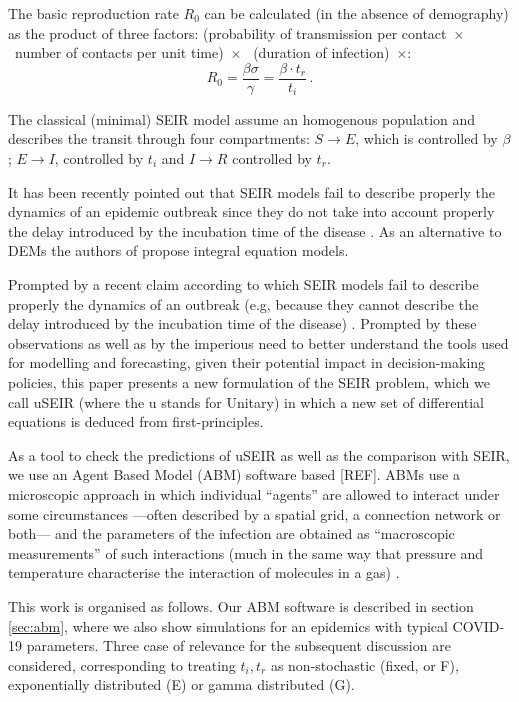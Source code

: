\documentclass[a4paper,oneside,11pt]{article}
\begin{document}
The basic reproduction rate $R_0$ can be calculated (in the absence of demography) as the product of three factors:
(probability of transmission per contact~$\times$~number of contacts per unit time)~$\times$~
(duration of infection)~$\times$:
\begin{equation}
R_0 = \frac{\beta \sigma}{\gamma} = \frac{\beta \cdot t_r}{t_i}\,.
\end{equation}

The classical (minimal) SEIR model assume an homogenous population and describes the transit through four compartments: $S \rightarrow E$, which is controlled by $\beta$ ; $E \rightarrow I$, controlled by $t_i$ and
$I \rightarrow R$ controlled by $t_r$. 

It has been recently pointed out that SEIR models fail to describe properly the dynamics of an epidemic outbreak since they do not take into account properly the delay introduced by the incubation time of the disease \cite{fodor2020integral}. As an alternative to DEMs the authors of \cite{fodor2020integral} propose integral equation models. 

Prompted by a recent claim according to which SEIR 
models fail to describe properly the dynamics of an outbreak (e.g, because they cannot describe the delay introduced by the incubation time of the disease) \cite{fodor2020integral}. Prompted by these observations as well as by the imperious need to better understand the tools used for modelling and forecasting, given their potential impact in decision-making policies, this paper presents a new formulation of the SEIR problem, which we call uSEIR (where the u stands for Unitary) in which a new set of differential equations is deduced from first-principles.

As a tool to check the predictions of uSEIR as well as the comparison with SEIR, we use an Agent Based Model (ABM) software based [REF]. ABMs use a microscopic approach in which individual ``agents'' are allowed to interact under some circumstances ---often described by a spatial grid, a connection network or both--- and the parameters of the infection are obtained as ``macroscopic measurements'' of such interactions (much in the same way that pressure and temperature characterise the interaction of molecules in a gas) \cite{Hunter2017}. 

This work is organised as follows. Our ABM software is described in section \ref{sec:abm}, where we also show simulations for an epidemics with typical COVID-19 parameters. Three case of relevance for the subsequent discussion are considered, corresponding to treating $t_i, t_r$ as non-stochastic (fixed, or F), exponentially distributed (E) or gamma distributed (G). 
\end{document}
